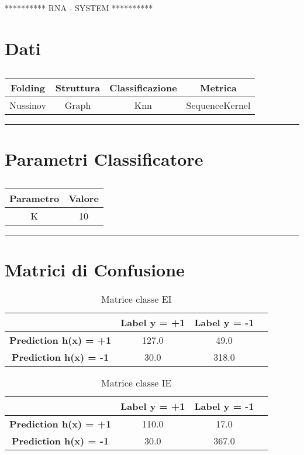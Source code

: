 \documentclass[12pt]{amsart}
\begin{document}
\centering 
********** RNA - SYSTEM ********** \\ 
 \section*{\bf{Dati}} 
 
 \begin{table}[h]
\begin{tabular}{|c|c|c|c|}
\hline {\bf{Folding}}  & {\bf{Struttura}} &{\bf{Classificazione}} & {\bf{Metrica}}  \\ 
 \hline \hline 
Nussinov&Graph&Knn&SequenceKernel\\ 
 \hline\end{tabular}
\caption{}
\end{table}

 \rule{1.12\linewidth}{0.1mm} 
\section*{\bf{Parametri Classificatore}} 
 
 \begin{table}[h]
\begin{tabular}{|c||c|}
\hline {\bf{Parametro}}  & {\bf{Valore}} \\ 
 \hline \hline 
K & 10 \\ 
 \hline\end{tabular}
\caption{}
\end{table}

 \rule{1.12\linewidth}{0.1mm} 
\section*{\bf{Matrici di Confusione}} 
 
 \begin{table}[h]
\begin{tabular}{|c||c|c|c|}
\hline & {\bf{Label y = +1}}  & {\bf{Label y = -1}} \\ 
 \hline \hline 
{\bf{Prediction h(x) = +1}} &127.0&49.0\\ 
 \hline 
{\bf{Prediction h(x) = -1}} &30.0&318.0\\ 
 \hline 
\end{tabular}
\caption{Matrice classe EI}
\end{table}

 \begin{table}[h]
\begin{tabular}{|c||c|c|c|}
\hline & {\bf{Label y = +1}}  & {\bf{Label y = -1}} \\ 
 \hline \hline 
{\bf{Prediction h(x) = +1}} &110.0&17.0\\ 
 \hline 
{\bf{Prediction h(x) = -1}} &30.0&367.0\\ 
 \hline 
\end{tabular}
\caption{Matrice classe IE}
\end{table}
\end{document}
